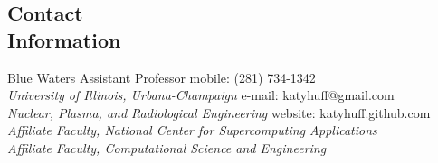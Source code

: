 \documentclass[margin,line]{resume}
\begin{document}
\begin{resume}

    \section{\mysidestyle Contact\\Information}
    Blue Waters Assistant Professor \hfill mobile: (281) 734-1342 \vspace{0mm}\\\vspace{0mm}%
        \textsl{University of Illinois, Urbana-Champaign}
        \hfill e-mail: katyhuff@gmail.com            \vspace{0mm}\\\vspace{0mm}%
    \textsl{Nuclear, Plasma, and Radiological Engineering}
        \hfill website: katyhuff.github.com     \vspace{0mm}\\\vspace{0mm}%
    \textsl{Affiliate Faculty, National Center for Supercomputing Applications}           \vspace{0mm}\\\vspace{0mm}%
    \textsl{Affiliate Faculty, Computational Science and Engineering}           \vspace{0mm}\\\vspace{-4.5mm}%


\end{resume}
\end{document}
